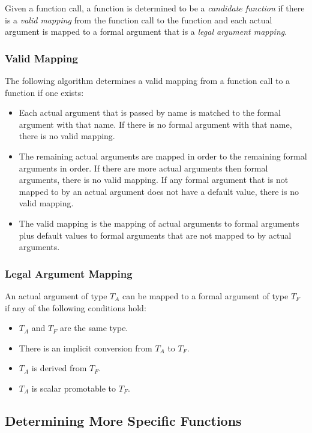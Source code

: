 Given a function call, a function is determined to be
a \emph{candidate function} if there is a \emph{valid mapping} from
the function call to the function and each actual argument is mapped
to a formal argument that is a \emph{legal argument mapping}.

\subsubsection{Valid Mapping}
\label{Valid_Mapping}

The following algorithm determines a valid mapping from a function
call to a function if one exists:
\begin{itemize}
\item
Each actual argument that is passed by name is matched to the formal
argument with that name.  If there is no formal argument with that
name, there is no valid mapping.
\item
The remaining actual arguments are mapped in order to the remaining
formal arguments in order.  If there are more actual arguments then
formal arguments, there is no valid mapping.  If any formal argument
that is not mapped to by an actual argument does not have a default
value, there is no valid mapping.
\item
The valid mapping is the mapping of actual arguments to formal
arguments plus default values to formal arguments that are not mapped
to by actual arguments.
\end{itemize}

\subsubsection{Legal Argument Mapping}
\label{Legal_Argument_Mapping}

An actual argument of type $T_A$ can be mapped to a formal argument of
type $T_F$ if any of the following conditions hold:
\begin{itemize}
\item $T_A$ and $T_F$ are the same type.
\item There is an implicit conversion from $T_A$ to $T_F$.
\item $T_A$ is derived from $T_F$.
\item $T_A$ is scalar promotable to $T_F$.
\end{itemize}

\subsection{Determining More Specific Functions}
\label{Determining_More_Specific_Functions}

